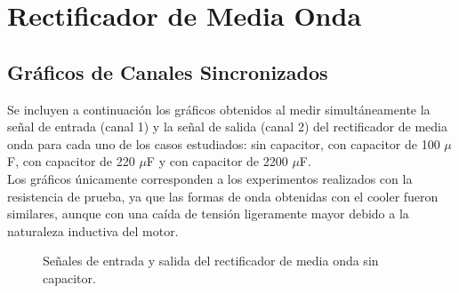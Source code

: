 \section{Rectificador de Media Onda}

\subsection{Gráficos de Canales Sincronizados}
Se incluyen a continuación los gráficos obtenidos al medir simultáneamente la señal de entrada (canal 1) y la señal de salida (canal 2) del rectificador de media onda para cada uno de los casos estudiados: sin capacitor, con capacitor de 100 $\mu$F, con capacitor de 220 $\mu$F y con capacitor de 2200 $\mu$F.\\
Los gráficos únicamente corresponden a los experimentos realizados con la resistencia de prueba, ya que las formas de onda obtenidas con el cooler fueron similares, aunque con una caída de tensión ligeramente mayor debido a la naturaleza inductiva del motor.

\begin{figure}[htbp]
    \centering
    \caption{Señales de entrada y salida del rectificador de media onda sin capacitor.}
    \label{fig:media_onda_sin_capacitor}
\end{figure}

